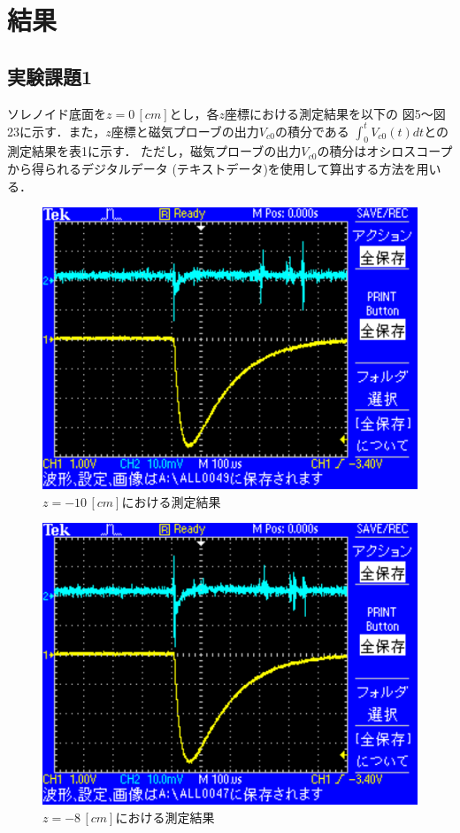 
\section{結果}

\subsection{実験課題1}
ソレノイド底面を$z=0\,[\si{cm}]$とし，各$z$座標における測定結果を以下の
図5～図23に示す．また，$z$座標と磁気プローブの出力$V_{c0}$の積分である
$\int_{0}^{t}V_{c0}(t)dt$との測定結果を表1に示す．
ただし，磁気プローブの出力$V_{c0}$の積分はオシロスコープから得られるデジタルデータ
(テキストデータ)を使用して算出する方法を用いる．

\begin{figure}[H]
    \centering
    \includegraphics[scale=0.5]{images-23.pdf}
    \caption{$z=-10\,[cm]$における測定結果}
\end{figure}

\begin{figure}[H]
    \centering
    \includegraphics[scale=0.5]{images-22.pdf}
    \caption{$z=-8\,[cm]$における測定結果}
\end{figure}

